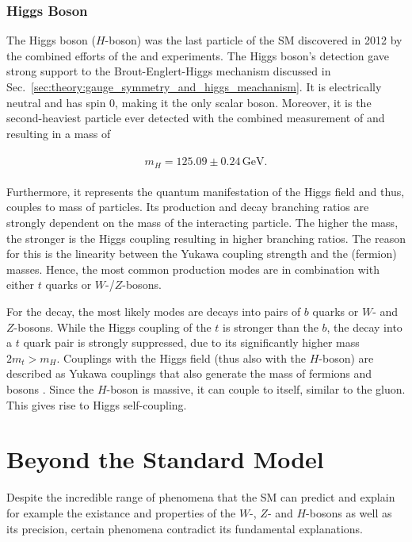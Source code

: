 \documentclass[bachelor,ngerman,english]{GAUBM}
\begin{document}
\subsubsection*{Higgs Boson}
The Higgs boson ($H$-boson) was the last particle of the SM discovered in 2012 by the combined efforts of the \atlas \cite{theory:higgs_discovery_01} and \cms \cite{theory:higgs_discovery_02} experiments. The Higgs boson's detection gave strong support to the Brout-Englert-Higgs mechanism discussed in Sec.~\ref{sec:theory:gauge_symmetry_and_higgs_meachanism}. It is electrically neutral and has spin 0, making it the only scalar boson. Moreover, it is the second-heaviest particle ever detected with the combined measurement of \atlas and \cms \cite{higgs_mass_combined} resulting in a mass of 

\begin{gather}
    \begin{aligned}
        m_H=125.09\pm0.24\,\text{GeV}.
        \label{eq:mass_h}
    \end{aligned}
\end{gather}

Furthermore, it represents the quantum manifestation of the Higgs field and thus, couples to mass of particles. Its production and decay branching ratios are strongly dependent on the mass of the interacting particle. The higher the mass, the stronger is the Higgs coupling resulting in higher branching ratios. The reason for this is the linearity between the Yukawa coupling strength and the (fermion) masses. Hence, the most common production modes are in combination with either $t$ quarks or $W$-/$Z$-bosons. 

For the decay, the most likely modes are decays into pairs of $b$ quarks or $W$- and $Z$-bosons. While the Higgs coupling of the $t$ is stronger than the $b$, the decay into a $t$ quark pair is strongly suppressed, due to its significantly higher mass $2m_t>m_H$. Couplings with the Higgs field (thus also with the $H$-boson) are described as Yukawa couplings that also generate the mass of fermions and bosons \cite{theory:higgs_mechanism_01,theory:higgs_mechanism_03}. Since the $H$-boson is massive, it can couple to itself, similar to the gluon. This gives rise to Higgs self-coupling.   

\section{Beyond the Standard Model}
\label{sec:theory:bsm}
Despite the incredible range of phenomena that the SM can predict and explain for example the existance and properties of the $W$-, $Z$- and $H$-bosons as well as its precision, certain phenomena contradict its fundamental explanations. 
\end{document}
